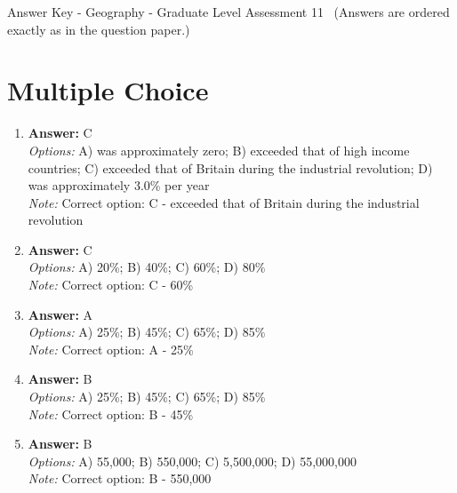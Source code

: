 \documentclass[12pt]{article}
\begin{document}
\begin{center}
Answer Key - Geography - Graduate Level Assessment 11 \
\small (Answers are ordered exactly as in the question paper.)
\end{center}

\section*{Multiple Choice}
\begin{enumerate}[label=\arabic*.]
\item \textbf{Answer:} C
\\ \textit{Options:} A) was approximately zero; B) exceeded that of high income countries; C) exceeded that of Britain during the industrial revolution; D) was approximately 3.0\% per year
\\ \textit{Note:} Correct option: C - exceeded that of Britain during the industrial revolution
\item \textbf{Answer:} C
\\ \textit{Options:} A) 20\%; B) 40\%; C) 60\%; D) 80\%
\\ \textit{Note:} Correct option: C - 60\%
\item \textbf{Answer:} A
\\ \textit{Options:} A) 25\%; B) 45\%; C) 65\%; D) 85\%
\\ \textit{Note:} Correct option: A - 25\%
\item \textbf{Answer:} B
\\ \textit{Options:} A) 25\%; B) 45\%; C) 65\%; D) 85\%
\\ \textit{Note:} Correct option: B - 45\%
\item \textbf{Answer:} B
\\ \textit{Options:} A) 55,000; B) 550,000; C) 5,500,000; D) 55,000,000
\\ \textit{Note:} Correct option: B - 550,000
\end{enumerate}
\end{document}
